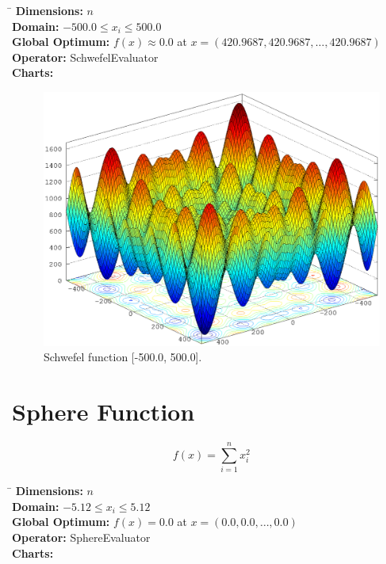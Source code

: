 \documentclass[12pt, a4paper]{article}
\begin{document}
		\begin{tabbing}
			\hspace{5cm}\=\kill
			\textbf{Dimensions:}     \> $n$ \\
			\textbf{Domain:}         \> $-500.0 \leq x_i \leq 500.0$ \\
			\textbf{Global Optimum:} \> $f(x) \approx 0.0$ at $x = (420.9687, 420.9687, \dots, 420.9687)$ \\
			\textbf{Operator:}       \> SchwefelEvaluator \\
			\textbf{Charts:}         \> \\
		\end{tabbing}

		\begin{figure}[ht]
			\includegraphics[width=\textwidth]{Images/Schwefel}
			\caption{Schwefel function [-500.0, 500.0].}
		\end{figure}

	\newpage

	\section*{Sphere Function}
		\begin{equation*}
			f(x)=\sum\limits_{i=1}^n x_i^2
		\end{equation*}

		\begin{tabbing}
			\hspace{5cm}\=\kill
			\textbf{Dimensions:}     \> $n$ \\
			\textbf{Domain:}         \> $-5.12 \leq x_i \leq 5.12$ \\
			\textbf{Global Optimum:} \> $f(x) = 0.0$ at $x = (0.0, 0.0, \dots, 0.0)$ \\
			\textbf{Operator:}       \> SphereEvaluator \\
			\textbf{Charts:}         \> \\
		\end{tabbing}
\end{document}
